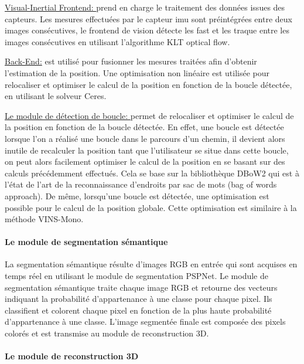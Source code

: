 \documentclass[11pt]{article}
\begin{document}
  \underline{Visual-Inertial Frontend: }
  prend en charge le traitement des données issues des capteurs. Les mesures effectuées par le capteur \acrshort{imu}
  sont préintégrées entre deux images consécutives, le frontend de vision détecte les \acrshort{fast}
  et les traque entre les images consécutives en utilisant l'algorithme KLT optical flow.

  \underline{Back-End:} est utilisé pour fusionner les mesures traitées afin d'obtenir l'estimation de la position. Une optimisation non linéaire
  est utilisée pour relocaliser et optimiser le calcul de la position en fonction de la boucle détectée, en utilisant le solveur Ceres. 

  \underline{Le module de détection de boucle: } permet de relocaliser et optimiser le calcul de la position en fonction de
  la boucle détectée. En effet, une boucle est détectée lorsque l'on a réalisé une boucle dans le parcours d'un chemin, il devient alors inutile
  de recalculer la position tant que l'utilisateur se situe dans cette boucle, on peut alors facilement optimiser le calcul de la position en se 
  basant sur des calculs précédemment effectués. Cela se base sur la bibliothèque DBoW2 qui est à l'état de l'art de la reconnaissance d'endroits 
  par sac de mots (bag of words approach). De même, lorsqu'une boucle est détectée, une optimisation est possible pour le calcul de la position 
  globale. Cette optimisation est similaire à la méthode VINS-Mono.

  \paragraph{Le module de segmentation sémantique}
  La segmentation sémantique résulte d'images RGB en entrée qui sont acquises en temps réel en utilisant le module de segmentation PSPNet. 
  Le module de segmentation sémantique traite chaque image RGB et retourne des vecteurs indiquant la probabilité d'appartenance à une classe
  pour chaque pixel. Ils classifient et colorent chaque pixel en fonction de la plus haute probabilité d'appartenance à une classe. 
  L'image segmentée finale est composée des pixels colorés et est transmise au module de reconstruction 3D.

  \paragraph{Le module de reconstruction 3D}
\end{document}
